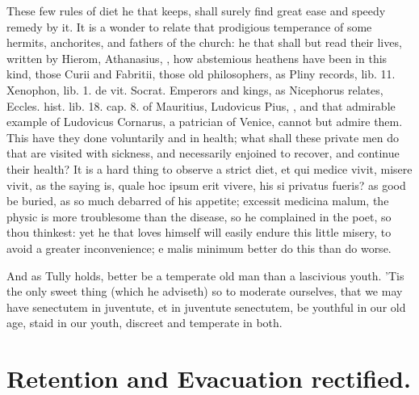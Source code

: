 {These few rules of diet he that keeps, shall surely find great ease and
speedy remedy by it. It is a wonder to relate that prodigious
temperance of some hermits, anchorites, and fathers of the church: he
that shall but read their lives, written by Hierom, Athanasius, \etc{},
how abstemious heathens have been in this kind, those Curii and
Fabritii, those old philosophers, as Pliny records, lib. 11. Xenophon,
lib. 1. de vit. Socrat. Emperors and kings, as Nicephorus relates,
Eccles. hist. lib. 18. cap. 8. of Mauritius, Ludovicus Pius, \etc{}, and
that admirable example of Ludovicus Cornarus, a patrician of
Venice, cannot but admire them. This have they done voluntarily and in
health; what shall these private men do that are visited with sickness,
and necessarily enjoined to recover, and continue their health?
It is a hard thing to observe a strict diet, et qui medice vivit,
misere vivit, as the saying is, quale hoc ipsum erit vivere, his
si privatus fueris? as good be buried, as so much debarred of his
appetite; excessit medicina malum, the physic is more troublesome than
the disease, so he complained in the poet, so thou thinkest: yet he
that loves himself will easily endure this little misery, to avoid a
greater inconvenience; e malis minimum better do this than do worse.

And as Tully holds, better be a temperate old man than a
lascivious youth. 'Tis the only sweet thing (which he adviseth) so to
moderate ourselves, that we may have senectutem in juventute, et in
juventute senectutem, be youthful in our old age, staid in our youth,
discreet and temperate in both.


\section{Retention and Evacuation rectified.}

}
